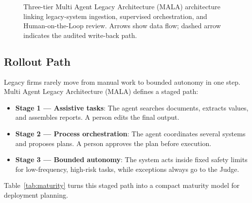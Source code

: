 \documentclass[conference]{IEEEtran}
\newcommand{\MALA}{Multi Agent Legacy Architecture (MALA)}
\begin{document}
\begin{figure}[!t]
\caption{Three-tier \MALA{} architecture linking legacy-system ingestion, supervised orchestration, and Human-on-the-Loop review. Arrows show data flow; dashed arrow indicates the audited write-back path.}\label{fig:arch}
\end{figure}


\subsection{Rollout Path}

Legacy firms rarely move from manual work to bounded autonomy in one step. \MALA{} defines a staged path:
\begin{itemize}
  \item \textbf{Stage 1 --- Assistive tasks}: The agent searches documents, extracts values, and assembles reports. A person edits the final output.
  \item \textbf{Stage 2 --- Process orchestration}: The agent coordinates several systems and proposes plans. A person approves the plan before execution.
  \item \textbf{Stage 3 --- Bounded autonomy}: The system acts inside fixed safety limits for low-frequency, high-risk tasks, while exceptions always go to the Judge.
\end{itemize}

Table~\ref{tab:maturity} turns this staged path into a compact maturity model for deployment planning.
\end{document}
